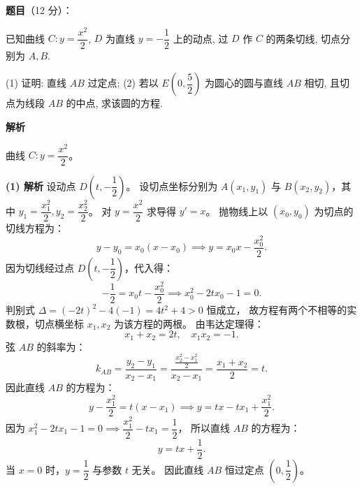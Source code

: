 \begin{answer}

\textbf{题目}（12 分）：

已知曲线 $C: y = \dfrac{x^2}{2}$, $D$ 为直线 $y = -\dfrac{1}{2}$ 上的动点, 过 $D$ 作 $C$ 的两条切线, 切点分别为 $A, B$.

(1) 证明: 直线 $AB$ 过定点;  
(2) 若以 $E\left(0, \dfrac{5}{2}\right)$ 为圆心的圆与直线 $AB$ 相切, 且切点为线段 $AB$ 的中点, 求该圆的方程.

\textbf{解析}

曲线 $C: y = \dfrac{x^2}{2}$。

\textbf{(1) 解析}
设动点 $D\left(t, -\dfrac{1}{2}\right)$。
设切点坐标分别为 $A(x_1, y_1)$ 与 $B(x_2, y_2)$，其中 $y_1 = \dfrac{x_1^2}{2}, y_2 = \dfrac{x_2^2}{2}$。
对 $y = \dfrac{x^2}{2}$ 求导得 $y' = x$。
抛物线上以 $(x_0, y_0)$ 为切点的切线方程为：
\nopagebreak[4]
\[y - y_0 = x_0(x - x_0) \implies y = x_0 x - \frac{x_0^2}{2}.\]
因为切线经过点 $D\left(t, -\dfrac{1}{2}\right)$，代入得：
\nopagebreak[4]
\[-\frac{1}{2} = x_0 t - \frac{x_0^2}{2} \implies x_0^2 - 2tx_0 - 1 = 0.\]
判别式 $\Delta = (-2t)^2 - 4(-1) = 4t^2 + 4 > 0$ 恒成立，
故方程有两个不相等的实数根，切点横坐标 $x_1, x_2$ 为该方程的两根。
由韦达定理得：
\nopagebreak[4]
\[x_1 + x_2 = 2t, \quad x_1 x_2 = -1.\]
弦 $AB$ 的斜率为：
\nopagebreak[4]
\[k_{AB} = \frac{y_2 - y_1}{x_2 - x_1} = \frac{\frac{x_2^2 - x_1^2}{2}}{x_2 - x_1} = \frac{x_1 + x_2}{2} = t.\]
因此直线 $AB$ 的方程为：
\nopagebreak[4]
\[y - \frac{x_1^2}{2} = t(x - x_1) \implies y = tx - tx_1 + \frac{x_1^2}{2}.\]
因为 $x_1^2 - 2tx_1 - 1 = 0 \implies \dfrac{x_1^2}{2} - tx_1 = \dfrac{1}{2}$，
所以直线 $AB$ 的方程为：
\nopagebreak[4]
\[y = tx + \frac{1}{2}.\]
当 $x = 0$ 时，$y = \dfrac{1}{2}$ 与参数 $t$ 无关。
因此直线 $AB$ 恒过定点 $\left(0, \dfrac{1}{2}\right)$。


\end{answer}
